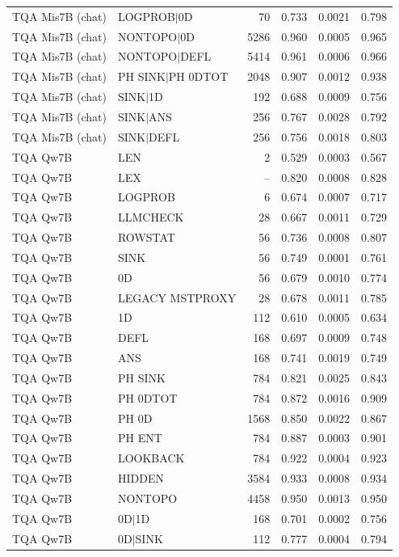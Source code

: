 \begin{longtable}{llrrrr}
TQA Mis7B (chat) & LOGPROB$\mid$0D & 70 & 0.733 & 0.0021 & 0.798 \\
TQA Mis7B (chat) & NONTOPO$\mid$0D & 5286 & 0.960 & 0.0005 & 0.965 \\
TQA Mis7B (chat) & NONTOPO$\mid$DEFL & 5414 & 0.961 & 0.0006 & 0.966 \\
TQA Mis7B (chat) & PH SINK$\mid$PH 0DTOT & 2048 & 0.907 & 0.0012 & 0.938 \\
TQA Mis7B (chat) & SINK$\mid$1D & 192 & 0.688 & 0.0009 & 0.756 \\
TQA Mis7B (chat) & SINK$\mid$ANS & 256 & 0.767 & 0.0028 & 0.792 \\
TQA Mis7B (chat) & SINK$\mid$DEFL & 256 & 0.756 & 0.0018 & 0.803 \\
TQA Qw7B & LEN & 2 & 0.529 & 0.0003 & 0.567 \\
TQA Qw7B & LEX & -- & 0.820 & 0.0008 & 0.828 \\
TQA Qw7B & LOGPROB & 6 & 0.674 & 0.0007 & 0.717 \\
TQA Qw7B & LLMCHECK & 28 & 0.667 & 0.0011 & 0.729 \\
TQA Qw7B & ROWSTAT & 56 & 0.736 & 0.0008 & 0.807 \\
TQA Qw7B & SINK & 56 & 0.749 & 0.0001 & 0.761 \\
TQA Qw7B & 0D & 56 & 0.679 & 0.0010 & 0.774 \\
TQA Qw7B & LEGACY MSTPROXY & 28 & 0.678 & 0.0011 & 0.785 \\
TQA Qw7B & 1D & 112 & 0.610 & 0.0005 & 0.634 \\
TQA Qw7B & DEFL & 168 & 0.697 & 0.0009 & 0.748 \\
TQA Qw7B & ANS & 168 & 0.741 & 0.0019 & 0.749 \\
TQA Qw7B & PH SINK & 784 & 0.821 & 0.0025 & 0.843 \\
TQA Qw7B & PH 0DTOT & 784 & 0.872 & 0.0016 & 0.909 \\
TQA Qw7B & PH 0D & 1568 & 0.850 & 0.0022 & 0.867 \\
TQA Qw7B & PH ENT & 784 & 0.887 & 0.0003 & 0.901 \\
TQA Qw7B & LOOKBACK & 784 & 0.922 & 0.0004 & 0.923 \\
TQA Qw7B & HIDDEN & 3584 & 0.933 & 0.0008 & 0.934 \\
TQA Qw7B & NONTOPO & 4458 & 0.950 & 0.0013 & 0.950 \\
TQA Qw7B & 0D$\mid$1D & 168 & 0.701 & 0.0002 & 0.756 \\
TQA Qw7B & 0D$\mid$SINK & 112 & 0.777 & 0.0004 & 0.794 \\

\end{longtable}
